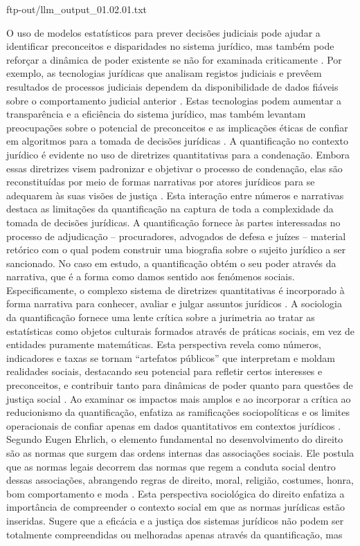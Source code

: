 ftp-out/llm_output_01.02.01.txt 

O uso de modelos estatísticos para prever decisões judiciais pode ajudar a identificar preconceitos e disparidades no sistema jurídico, mas também pode reforçar a dinâmica de poder existente se não for examinada criticamente \cite{ 101017s0003975609000150}. Por exemplo, as tecnologias jurídicas que analisam registos judiciais e prevêem resultados de processos judiciais dependem da disponibilidade de dados fiáveis sobre o comportamento judicial anterior \cite{ribeiro2021quantification}. Estas tecnologias podem aumentar a transparência e a eficiência do sistema jurídico, mas também levantam preocupações sobre o potencial de preconceitos e as implicações éticas de confiar em algoritmos para a tomada de decisões jurídicas \cite{silva2023role}. A quantificação no contexto jurídico é evidente no uso de diretrizes quantitativas para a condenação. Embora essas diretrizes visem padronizar e objetivar o processo de condenação, elas são reconstituídas por meio de formas narrativas por atores jurídicos para se adequarem às suas visões de justiça \cite{101111lsi12334}. Esta interação entre números e narrativas destaca as limitações da quantificação na captura de toda a complexidade da tomada de decisões jurídicas. A quantificação fornece às partes interessadas no processo de adjudicação – procuradores, advogados de defesa e juízes – material retórico com o qual podem construir uma biografia sobre o sujeito jurídico a ser sancionado. No caso em estudo, a quantificação obtém o seu poder através da narrativa, que é a forma como damos sentido aos fenómenos sociais. Especificamente, o complexo sistema de diretrizes quantitativas é incorporado à forma narrativa para conhecer, avaliar e julgar assuntos jurídicos \cite{101111lsi12334}. A sociologia da quantificação fornece uma lente crítica sobre a jurimetria ao tratar as estatísticas como objetos culturais formados através de práticas sociais, em vez de entidades puramente matemáticas. Esta perspectiva revela como números, indicadores e taxas se tornam “artefatos públicos” que interpretam e moldam realidades sociais, destacando seu potencial para refletir certos interesses e preconceitos, e contribuir tanto para dinâmicas de poder quanto para questões de justiça social \cite{camargo2021,paiva2021}. Ao examinar os impactos mais amplos e ao incorporar a crítica ao reducionismo da quantificação, enfatiza as ramificações sociopolíticas e os limites operacionais de confiar apenas em dados quantitativos em contextos jurídicos \cite{sousa2024,saltelli2020}. Segundo Eugen Ehrlich, o elemento fundamental no desenvolvimento do direito são as normas que surgem das ordens internas das associações sociais. Ele postula que as normas legais decorrem das normas que regem a conduta social dentro dessas associações, abrangendo regras de direito, moral, religião, costumes, honra, bom comportamento e moda \cite{venturini2024, venturini2024p24-25, venturini2024p22-23, venturini2024p18}. Esta perspectiva sociológica do direito enfatiza a importância de compreender o contexto social em que as normas jurídicas estão inseridas. Sugere que a eficácia e a justiça dos sistemas jurídicos não podem ser totalmente compreendidas ou melhoradas apenas através da quantificação, mas 